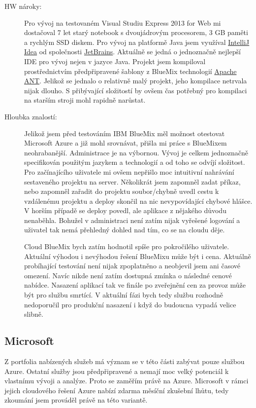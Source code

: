 \begin{description}
	\item [HW nároky:] Pro vývoj na testovaném Visual Studiu Express 2013 for Web mi dostačoval 7 let starý notebook s dvoujádrovým procesorem, 3 GB paměti a rychlým SSD diskem. Pro vývoj na platformě Java jsem využíval \href{http://www.jetbrains.com/idea/}{IntelliJ Idea} od společnosti \href{http://www.jetbrains.com/}{JetBrains}. Aktuálně se jedná o jednoznačně nejlepší IDE pro vývoj nejen v jazyce Java. Projekt jsem kompiloval prostřednictvím předpřipravené šablony z BlueMix technologií \href{http://ant.apache.org/}{Apache ANT}. Jelikož se jednalo o relativně malý projekt, jeho kompilace netrvala nijak dlouho. S přibývající složitostí by ovšem čas potřebný pro kompilaci na starším stroji mohl rapidně narůstat.
	\item [Hloubka znalostí:] Jelikož jsem před testováním IBM BlueMix měl možnost otestovat Microsoft Azure a již mohl srovnávat, přišla mi práce s BlueMixem neohrabanější. Administrace je na výbornou. Vývoj je celkem jednoznačně specifikován použitým jazykem a technologií a od toho se odvíjí složitost. Pro začínajícího uživatele mi ovšem nepřišlo moc intuitivní nahrávání sestaveného projektu na server. Několikrát jsem zapomněl zadat příkaz, nebo zapomněl zařadit do projektu soubor/chybně uvedl cestu k vzdálenému projektu a deploy skončil na nic nevypovídající chybové hlášce. V horším případě se deploy povedl, ale aplikace z nějakého důvodu nenaběhla. Bohužel v administraci není zatím nijak vyřešené logování a uživatel tak nemá přehledný dohled nad tím, co se na cloudu děje.

Cloud BlueMix bych zatím hodnotil spíše pro pokročilého uživatele. Aktuální výhodou i nevýhodou řešení BlueMixu může být i cena. Aktuálně probíhající testování není nijak zpoplatněno a neobjevil jsem ani časové omezení. Navíc nikde není zatím dostupná zmínka o následné cenové nabídce. Nasazení aplikací tak ve finále po zveřejnění cen za provoz může být pro službu smrtící. V aktuální fázi bych tedy službu rozhodně nedoporučil pro produkční nasazení i když do budoucna vypadá velice slibně.
\end{description}

\subsection{Microsoft}
Z portfolia nabízených služeb má význam se v této části zabývat pouze službou Azure. Ostatní služby jsou předpřipravené a nemají moc velký potenciál k vlastnímu vývoji a analýze. Proto se zaměřím právě na Azure. Microsoft v rámci jejich cloudového řešení Azure nabízí zdarma měsíční zkušební lhůtu, tedy zkoumání jsem prováděl právě na této variantě.

